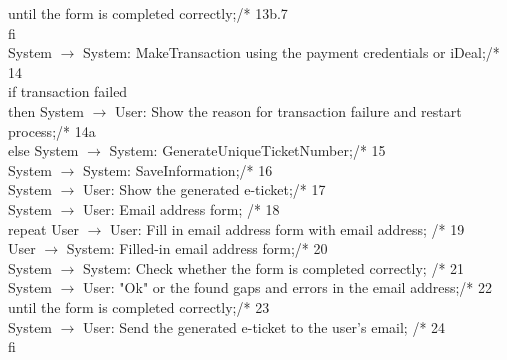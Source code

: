 \phantom{x}\hspace{7mm} until the form is completed correctly;\hfill /* 13b.7\\
fi\\
System $\rightarrow$ System: MakeTransaction using the payment credentials or iDeal;\hfill /* 14\\
if transaction failed\\
then System $\rightarrow$ User: Show the reason for transaction failure and restart process;\hfill /* 14a\\
else System $\rightarrow$ System: GenerateUniqueTicketNumber;\hfill /* 15\\
\phantom{x}\hspace{7mm} System $\rightarrow$ System: SaveInformation;\hfill /* 16\\
\phantom{x}\hspace{7mm} System $\rightarrow$ User: Show the generated e-ticket;\hfill /* 17\\
\phantom{x}\hspace{7mm} System $\rightarrow$ User: Email address form; \hfill /* 18\\
\phantom{x}\hspace{7mm} repeat User $\rightarrow$ User: Fill in email address form with email address; \hfill /* 19\\
\phantom{x}\hspace{14mm} User $\rightarrow$ System: Filled-in email address form;\hfill /* 20\\
\phantom{x}\hspace{14mm} System $\rightarrow$ System: Check whether the form is completed correctly; \hfill /* 21\\
\phantom{x}\hspace{14mm} System $\rightarrow$ User: "Ok" or the found gaps and errors in the email address;\hfill /* 22\\
\phantom{x}\hspace{7mm} until the form is completed correctly;\hfill /* 23\\
\phantom{x}\hspace{7mm} System $\rightarrow$ User: Send the generated e-ticket to the user's email; \hfill /* 24\\
fi

